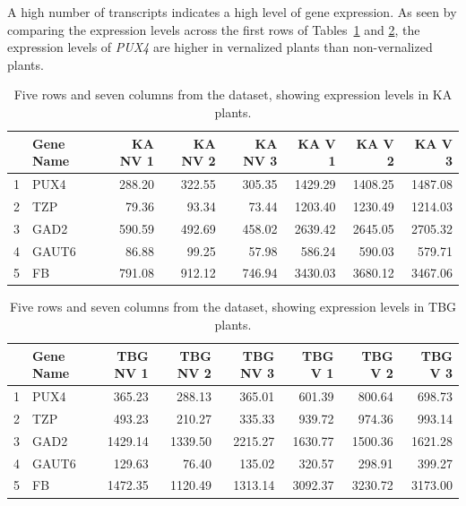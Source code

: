 A high number of transcripts indicates a high level of gene expression. As seen by comparing the expression levels across the first rows of Tables~\ref{sampleArenosaKA} and \ref{sampleArenosaTBG}, the expression levels of \textit{PUX4} are higher in vernalized plants than non-vernalized plants.

\begin{table}[ht]
	\centering
	\begin{tabular}{rlrrrrrr}
		\hline
		& Gene Name & KA NV 1 & KA NV 2 & KA NV 3 & KA V 1 & KA V 2 & KA V 3 \\ 
		\hline
		1 & PUX4 & 288.20 & 322.55 & 305.35 & 1429.29 & 1408.25 & 1487.08 \\ 
		2 & TZP & 79.36 & 93.34 & 73.44 & 1203.40 & 1230.49 & 1214.03 \\ 
		3 & GAD2 & 590.59 & 492.69 & 458.02 & 2639.42 & 2645.05 & 2705.32 \\ 
		4 & GAUT6 & 86.88 & 99.25 & 57.98 & 586.24 & 590.03 & 579.71 \\ 
		5 & FB & 791.08 & 912.12 & 746.94 & 3430.03 & 3680.12 & 3467.06 \\ 
		\hline
	\end{tabular}
	\caption{Five rows and seven columns from the  dataset, showing expression levels in KA plants.} 
	\label{sampleArenosaKA}
\end{table}

\begin{table}[ht]
	\centering
	\begin{tabular}{rlrrrrrr}
		\hline
		& Gene Name & TBG NV 1 & TBG NV 2 & TBG NV 3 & TBG V 1 & TBG V 2 & TBG V 3 \\ 
		\hline
		1 & PUX4 & 365.23 & 288.13 & 365.01 & 601.39 & 800.64 & 698.73 \\ 
		2 & TZP & 493.23 & 210.27 & 335.33 & 939.72 & 974.36 & 993.14 \\ 
		3 & GAD2 & 1429.14 & 1339.50 & 2215.27 & 1630.77 & 1500.36 & 1621.28 \\ 
		4 & GAUT6 & 129.63 & 76.40 & 135.02 & 320.57 & 298.91 & 399.27 \\ 
		5 & FB & 1472.35 & 1120.49 & 1313.14 & 3092.37 & 3230.72 & 3173.00 \\ 
		\hline
	\end{tabular}
	\caption{Five rows and seven columns from the  dataset, showing expression levels in TBG plants.} 
	\label{sampleArenosaTBG}
\end{table}

